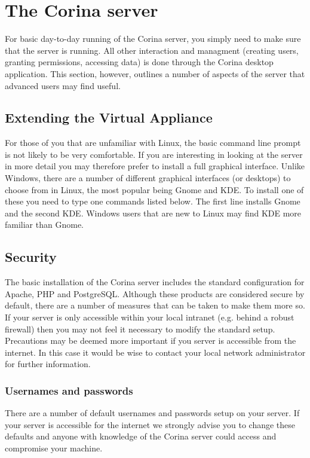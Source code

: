
\chapter{The Corina server}
\label{txt:servermaintenance}

For basic day-to-day running of the Corina server, you simply need to make sure that the server is running.  All other interaction and managment (creating users, granting permissions, accessing data) is done through the Corina desktop application.  This section, however, outlines a number of aspects of the server that advanced users may find useful.

\section{Extending the Virtual Appliance}
For those of you that are unfamiliar with Linux, the basic command line prompt is not likely to be very comfortable.  If you are interesting in looking at the server in more detail you may therefore prefer to install a full graphical interface.  Unlike Windows, there are a number of different graphical interfaces (or desktops) to choose from in Linux, the most popular being Gnome and KDE.  To install one of these you need to type one commands listed below.  The first line installs Gnome and the second KDE. Windows users that are new to Linux may find KDE more familiar than Gnome.


\section{Security}
The basic installation of the Corina server includes the standard configuration for Apache, PHP and PostgreSQL.  Although these products are considered secure by default, there are a number of measures that can be taken to make them more so.  If your server is only accessible within your local intranet (e.g. behind a robust firewall) then you may not feel it necessary to modify the standard setup.  Precautions may be deemed more important if you server is accessible from the internet.  In this case it would be wise to contact your local network administrator for further information.

\subsection{Usernames and passwords}
\label{txt:passwords}
There are a number of default usernames and passwords setup on your server.  If your server is accessible for the internet we strongly advise you to change these defaults and anyone with knowledge of the Corina server could access and compromise your machine.

